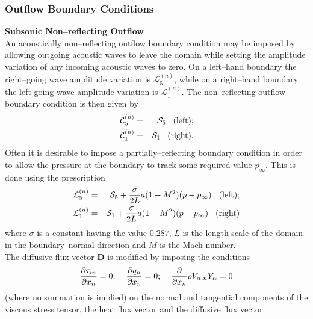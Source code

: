 \documentclass[dvips]{article}
\begin{document}
\subsubsection{Outflow Boundary Conditions}

{\bf Subsonic Non--reflecting Outflow}\\
An acoustically non--reflecting outflow boundary condition may be imposed by
allowing outgoing acoustic waves to leave the domain while setting the
amplitude variation of any incoming acoustic waves to zero.  On a
left--hand boundary the right--going wave amplitude variation is
${\mathcal L}_{5}^{(n)}$, while on a right--hand boundary the left-going wave
amplitude variation is ${\mathcal L}_{1}^{(n)}$.  The non--reflecting
outflow boundary condition is then given by
\begin{eqnarray}
{\mathcal L}_{5}^{(n)} & = & {\mathcal S}_{5}\hspace{3mm}{\rm (left);}
\nonumber \\
{\mathcal L}_{1}^{(n)} & = & {\mathcal S}_{1}\hspace{3mm}{\rm (right)}.
\end{eqnarray}
Often it is desirable to impose a partially--reflecting boundary
condition in order to allow the pressure at the boundary to track some
required value $p_{\infty}$.  This is done using the prescription
\begin{eqnarray}
{\mathcal L}_{5}^{(n)} & = & {\mathcal S}_{5}
+ \frac{\sigma}{2L}a(1-M^{2})(p-p_{\infty})
\hspace{3mm}{\rm (left);} \nonumber \\
{\mathcal L}_{1}^{(n)} & = & {\mathcal S}_{1}
+ \frac{\sigma}{2L}a(1-M^{2})(p-p_{\infty})
\hspace{3mm}{\rm (right)}
\end{eqnarray}
where $\sigma$ is a constant having the value $0.287$, $L$ is the length
scale of the domain in the boundary--normal direction and $M$ is the Mach
number.\\[2mm]
The diffusive flux vector ${\mathbf D}$ is modified by imposing the
conditions
\begin{equation}
\frac{\partial \tau_{in}}{\partial x_{n}} = 0; \hspace{4mm}
\frac{\partial q_{n}}{\partial x_{n}} = 0; \hspace{4mm}
\frac{\partial}{\partial x_{n}}\rho V_{\alpha,n}Y_{\alpha} = 0
\end{equation}
(where no summation is implied) on the normal and tangential components of the
viscous stress tensor, the heat flux vector and the diffusive flux vector.
\end{document}
